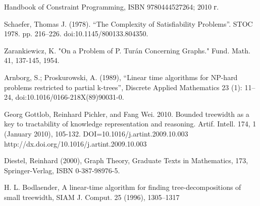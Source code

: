 \documentclass[12pt]{article}
\begin{document}
 Handbook of Constraint Programming, ISBN 9780444527264; 2010 г.

 Schaefer, Thomas J. (1978). 
``The Complexity of Satisfiability Problems''. STOC 1978. pp. 216–226. doi:10.1145/800133.804350.

 Zarankiewicz, K. "On a Problem of P. Turán Concerning Graphs." Fund. Math. 41, 137-145, 1954. 

 Arnborg, S.; Proskurowski, A. (1989), 
``Linear time algorithms for NP-hard problems restricted to partial k-trees'',
Discrete Applied Mathematics 23 (1): 11–24, doi:10.1016/0166-218X(89)90031-0.

Georg Gottlob, Reinhard Pichler, and Fang Wei. 2010. Bounded treewidth as a key to tractability of knowledge representation and reasoning. Artif. Intell. 174, 1 (January 2010), 105-132. DOI=10.1016/j.artint.2009.10.003 http://dx.doi.org/10.1016/j.artint.2009.10.003

Diestel, Reinhard (2000), Graph Theory, Graduate Texts in Mathematics, 
173, Springer-Verlag, ISBN 0-387-98976-5.

H. L. Bodlaender, A linear-time algorithm for finding 
tree-decompositions of small
treewidth, SIAM J. Comput. 25 (1996), 1305–1317


\endthebibliography
\end{document}
